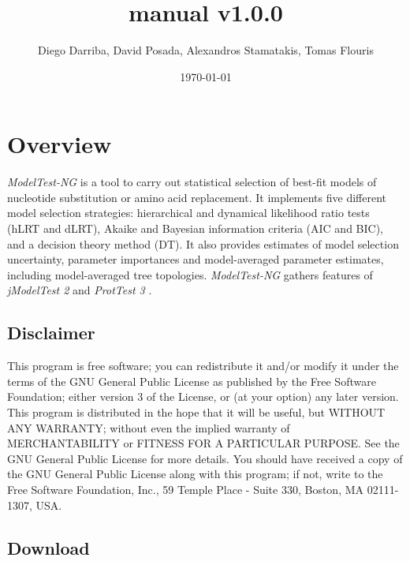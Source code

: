 \documentclass[10pt,twoside,a4paper]{article}
\begin{document}
\providecommand{\versionnumber}{1.0.0}
\title{\normalsize manual v\versionnumber}
\author{Diego Darriba, David Posada, Alexandros Stamatakis, Tomas Flouris}
\date{\today}
\maketitle

\newcommand{\modeltest}{\emph{ModelTest-NG} }
\newcommand{\modeltestbin}{\emph{modeltest-ng} }
\newcommand{\modeltestguibin}{\emph{modeltest-gui} }

\setcounter{tocdepth}{2}
\tableofcontents

\clearpage
\setlength{\parskip}{1em}

\section{Overview}

{\modeltest} is a tool to carry out statistical selection of best-fit models of nucleotide substitution or amino acid replacement.
It implements five different model selection strategies: hierarchical and dynamical likelihood ratio tests (hLRT and dLRT), Akaike and Bayesian information criteria (AIC and BIC), and a decision theory method (DT).
It also provides estimates of model selection uncertainty, parameter importances and model-averaged parameter estimates, including model-averaged tree topologies.
{\modeltest} gathers features of {\em jModelTest 2} \citep{darriba2012} and {\em ProtTest 3} \citep{darriba2011}.

\subsection{Disclaimer}

{\footnotesize
This program is free software; you can redistribute it and/or modify it under the terms of the GNU General Public License as published by the Free Software Foundation;
either version 3 of the License, or (at your option) any later version. This program is distributed in the hope that it will be useful, but WITHOUT ANY WARRANTY;
without even the implied warranty of MERCHANTABILITY or FITNESS FOR A PARTICULAR PURPOSE. See the GNU General Public License for more details.
You should have received a copy of the GNU General Public License along with this program; if not, write to the Free Software Foundation, Inc., 59 Temple Place - Suite 330, Boston, MA 02111-1307, USA.
}

\subsection{Download}
\end{document}
